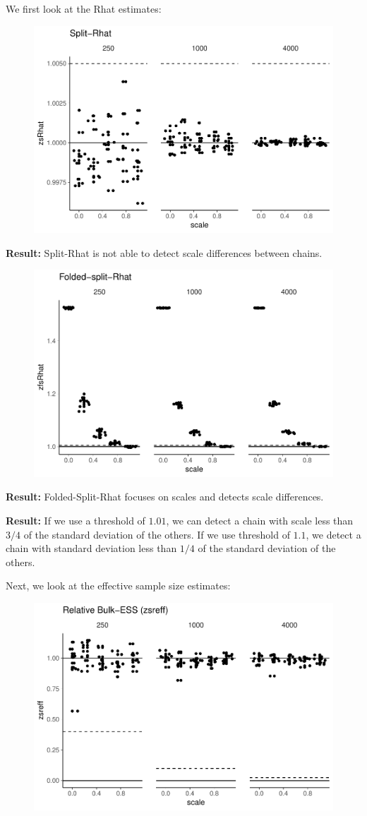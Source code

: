 \documentclass[american,]{article}
\begin{document}
We first look at the Rhat estimates:

\begin{figure}[tp]
  \centering
  \includegraphics[width=0.6\linewidth]{graphics/zsrhat-scaled-chain-1.pdf}
\end{figure}

\textbf{Result:} Split-Rhat is not able to detect scale differences
between chains.

\begin{figure}[tp]
  \centering
  \includegraphics[width=0.6\linewidth]{graphics/zfsrhat-scaled-chain-1.pdf}
\end{figure}

\textbf{Result:} Folded-Split-Rhat focuses on scales and detects scale
differences.

\textbf{Result:} If we use a threshold of \(1.01\), we can detect a
chain with scale less than \(3/4\) of the standard deviation of the
others. If we use threshold of \(1.1\), we detect a chain with standard
deviation less than \(1/4\) of the standard deviation of the others.

Next, we look at the effective sample size estimates:

\begin{figure}[tp]
  \centering
  \includegraphics[width=0.6\linewidth]{graphics/zsreff-scaled-chain-1.pdf}
\end{figure}
\end{document}
